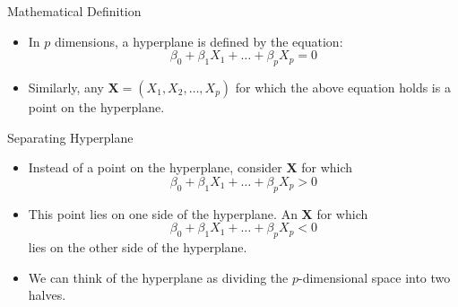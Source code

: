 \begin{frame}{Mathematical Definition}
\begin{itemize}
  \item In \( p \) dimensions, a hyperplane is defined by the equation:
  \[
  \beta_0 + \beta_1 X_1 + \dots + \beta_p X_p = 0
  \]
  \item Similarly, any \( \mathbf{X} = (X_1, X_2, \dots, X_p) \) for which the above equation holds is a point on the hyperplane.
\end{itemize}
\end{frame}


\begin{frame}{Separating Hyperplane}
\begin{itemize}
  \item Instead of a point on the hyperplane, consider \( \mathbf{X} \) for which
  \[
  \beta_0 + \beta_1 X_1 + \dots + \beta_p X_p > 0
  \]
  \item This point lies on one side of the hyperplane. An \( \mathbf{X} \) for which
  \[
  \beta_0 + \beta_1 X_1 + \dots + \beta_p X_p < 0
  \]
  lies on the other side of the hyperplane.
  \item We can think of the hyperplane as dividing the \( p \)-dimensional space into two halves.
\end{itemize}
\end{frame}

